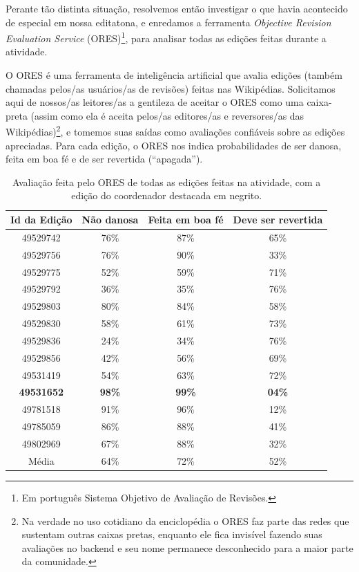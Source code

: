 Perante tão distinta situação, resolvemos então investigar o que havia acontecido de especial em nossa editatona, e enredamos a ferramenta \textit{Objective Revision Evaluation Service} (ORES)\footnote{Em português Sistema Objetivo de Avaliação de Revisões.}, para analisar todas as edições feitas durante a atividade.

O ORES é uma ferramenta de inteligência artificial que avalia edições (também chamadas pelos/as usuários/as de revisões) feitas nas Wikipédias. Solicitamos aqui de nossos/as leitores/as a gentileza de aceitar o ORES como uma caixa-preta (assim como ela é aceita pelos/as editores/as e reversores/as das Wikipédias)\footnote{Na verdade no uso cotidiano da enciclopédia o ORES faz parte das redes que sustentam outras caixas pretas, enquanto ele fica invisível fazendo suas avaliações no backend e seu nome permanece desconhecido para a maior parte da comunidade.}, e tomemos suas saídas como avaliações confiáveis sobre as edições apreciadas. Para cada edição, o ORES nos indica probabilidades de ser danosa, feita em boa fé e de ser revertida (``apagada'').

\begin{center}
\begin{table}
\begin{tabular}{ |c|c|c|c| } 
 \hline
\textbf{Id da Edição} & \textbf{Não danosa} & \textbf{Feita em boa fé} & \textbf{Deve ser revertida} \\
\hline
49529742 & 76\% & 87\% & 65\% \\
\hline
49529756 & 76\% & 90\% & 33\% \\
\hline
49529775 & 52\% & 59\% & 71\% \\
\hline
49529792 & 36\% & 35\% & 76\% \\
\hline
49529803 & 80\% & 84\% & 58\% \\
\hline
49529830 & 58\% & 61\% & 73\% \\
\hline
49529836 & 24\% & 34\% & 76\% \\
\hline
49529856 & 42\% & 56\% & 69\% \\
\hline
49531419 & 54\% & 63\% & 72\% \\
\hline
\textbf{49531652} & \textbf{98\%} & \textbf{99\%} & \textbf{04\%} \\
\hline
49781518 & 91\% & 96\% & 12\% \\
\hline
49785059 & 86\% & 88\% & 41\% \\
\hline
49802969 & 67\% & 88\% & 32\% \\
\hline
Média & 64\% & 72\% & 52\% \\
 \hline
\end{tabular}
\caption{Avaliação feita pelo ORES de todas as edições feitas na atividade, com a edição do coordenador destacada em negrito.}
\label{table:avaliacao-ores}
\end{table}
\end{center}

